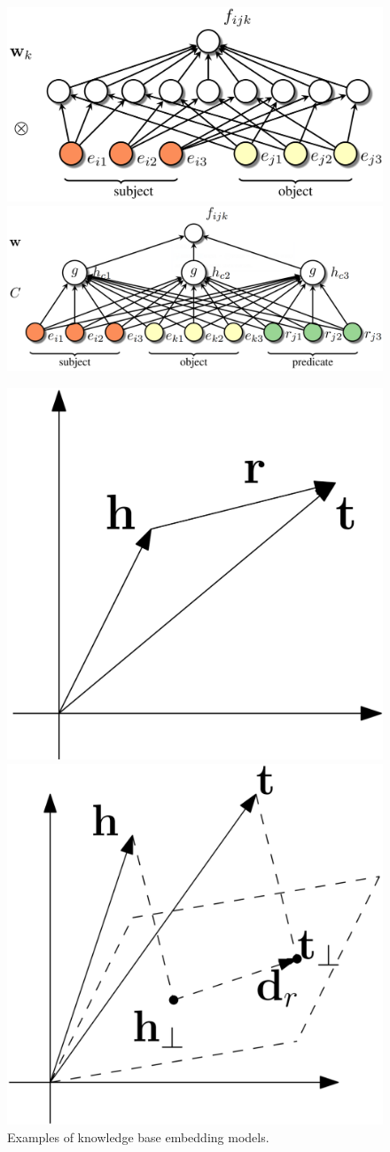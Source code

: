 \begin{figure}[htp]
  \centering
    {\includegraphics[width=0.48\columnwidth]{figure/rw/kbc-rescal.png}}
  \hspace{1em}
    {\includegraphics[width=0.48\columnwidth]{figure/rw/kbc-ermlp.png}}

  \vspace{1em}

    {\includegraphics[width=0.30\columnwidth]{figure/rw/kbc-transe.png}}
  \hspace{4em}
    {\includegraphics[width=0.30\columnwidth]{figure/rw/kbc-transh.png}}
            {Examples of knowledge base embedding models.}
  \label{fig:rw-kbe}
\end{figure}


